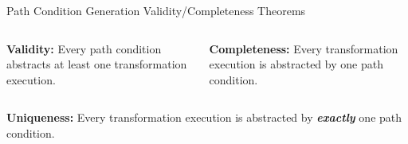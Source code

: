 \documentclass[final,hyperref={pdfpagelabels=false}]{beamer}
\begin{document}
\begin{frame}{}
\begin{columns}[t]
\begin{column}{.485\linewidth}
			\begin{block}{Path Condition Generation Validity/Completeness Theorems~\cite{LuVa2013a}}
                \begin{columns}[t]
                \begin{column}{.4\linewidth}
              \textbf{Validity:}
              \small{Every path condition abstracts at least one transformation execution.}
              
              \end{column}
              \hspace{-2cm}
			  \vrule{} 
              \hspace{1cm}
                            
              \begin{column}{.485\linewidth}
                  \textbf{Completeness:}
                    \small{Every transformation execution is abstracted by one
                    path condition.}
                 \end{column}                            
                 \end{columns} 
                 \vspace{0.5cm} 
                 \vspace{0.5cm} 
                 \small{\textbf{Uniqueness:}}
                 \footnotesize{Every transformation execution is abstracted by \textbf{\textit{exactly}} one
                 path condition.}              
                 
                \end{block}   
                

\end{column}
\end{columns}
\end{frame}
\end{document}
